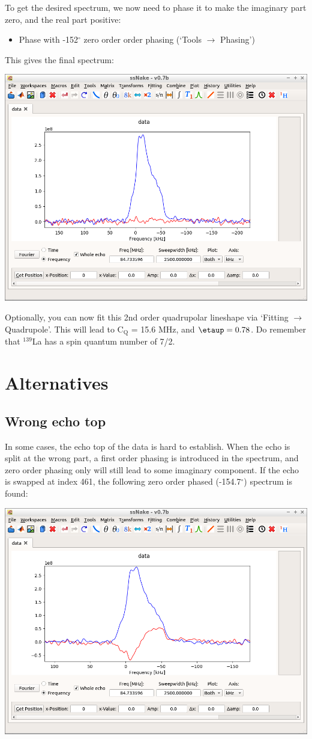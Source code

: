 \documentclass[11pt,a4paper]{article}
\begin{document}
To get the desired spectrum, we now need to phase it to make the imaginary part zero, and the real part positive:
\begin{itemize}
\item Phase with -152$^\circ$ zero order order phasing (`Tools $\longrightarrow$ Phasing')
\end{itemize}
This gives the final spectrum:
\begin{center}
\includegraphics[width=0.8\linewidth]{Figs/Fig4.png}
\end{center}

Optionally, you can now fit this 2nd order quadrupolar lineshape via `Fitting $\longrightarrow$
Quadrupole'. This will lead to C$_\text{Q}$ = 15.6 MHz, and $\etaup = 0.78$. Do remember that $^{139}$La has a spin quantum number of 7/2.

\section{Alternatives}
\subsection{Wrong echo top}
In some cases, the echo top of the data is hard to establish. When the echo is split at the wrong part, a first order phasing is introduced in the spectrum, and zero order phasing only will still lead to some imaginary component. If the echo is swapped at index 461, the following zero order phased (-154.7$^\circ$) spectrum is found:
\begin{center}
\includegraphics[width=0.8\linewidth]{Figs/Fig5.png}
\end{center}
\end{document}
